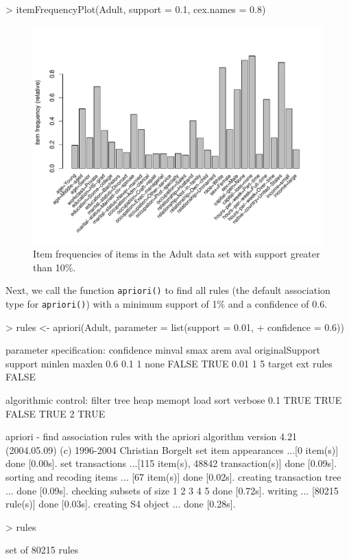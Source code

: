 \documentclass[10pt,a4paper]{article}
\newcommand{\func}[1]{\mbox{\texttt{#1()}}}
\begin{document}
\begin{Schunk}
\begin{Sinput}
> itemFrequencyPlot(Adult, support = 0.1, cex.names = 0.8)
\end{Sinput}
\end{Schunk}
\begin{figure}
\centering
\includegraphics{arules-019}
\caption{Item frequencies of items in the Adult data set with support greater than 10\%.}
\label{fig:itemFrequencyPlot}
\end{figure}

Next, we call the function
\func{apriori} to find all rules (the default association type for
\func{apriori}) with a minimum support of 1\% and a confidence of 0.6.

\begin{Schunk}
\begin{Sinput}
> rules <- apriori(Adult, parameter = list(support = 0.01, 
+     confidence = 0.6))
\end{Sinput}
\begin{Soutput}
parameter specification:
 confidence minval smax arem  aval originalSupport support minlen maxlen
        0.6    0.1    1 none FALSE            TRUE    0.01      1      5
 target   ext
  rules FALSE

algorithmic control:
 filter tree heap memopt load sort verbose
    0.1 TRUE TRUE  FALSE TRUE    2    TRUE

apriori - find association rules with the apriori algorithm
version 4.21 (2004.05.09)        (c) 1996-2004   Christian Borgelt
set item appearances ...[0 item(s)] done [0.00s].
set transactions ...[115 item(s), 48842 transaction(s)] done [0.09s].
sorting and recoding items ... [67 item(s)] done [0.02s].
creating transaction tree ... done [0.09s].
checking subsets of size 1 2 3 4 5 done [0.72s].
writing ... [80215 rule(s)] done [0.03s].
creating S4 object  ... done [0.28s].
\end{Soutput}
\begin{Sinput}
> rules
\end{Sinput}
\begin{Soutput}
set of 80215 rules 
\end{Soutput}
\end{Schunk}
\end{document}
